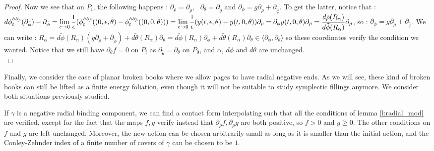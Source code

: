 \documentclass[../main.tex]{subfiles}
\begin{document}
\begin{proof}
Now we see that on $P_i$, the following happens : $\partial_\rho = \partial_{\tilde{\rho}},\text{ } \partial_\theta = \partial_{\tilde{\theta}}$ and $\partial_\phi = g\partial_{\tilde{\rho}} +  \partial_{\tilde{\phi}} $. To get the latter, notice that : $d\phi^{h\partial_\rho}_t(\partial_{\tilde{\phi}}) - \partial_{\tilde{\phi}}= \displaystyle\lim_{\epsilon\rightarrow0}\frac{1}{\epsilon}(\phi_t^{h\partial_{\tilde{\rho}}}((0,\epsilon,\tilde{\theta})-\phi_t^{h\partial_{\tilde{\rho}}}((0,0,\tilde{\theta}))) = \displaystyle\lim_{\epsilon\rightarrow0}\frac{1}{\epsilon}(y(t,\epsilon,\tilde{\theta}) - y(t,0,\tilde{\theta}))\partial_{\tilde{\rho}} = \partial_\phi y(t,0,\tilde{\theta})\partial_{\tilde{\rho}} = \frac{d\tilde{\rho}(R_\alpha)}{d\tilde{\phi}(R_\alpha)}\partial_{\tilde{\rho}}$, so : $\partial_\phi = g\partial_{\tilde{\rho}} + \partial_{\tilde{\phi}}$. We can write : $R_\alpha = d\tilde{\phi}(R_\alpha)(g\partial_{\tilde{\rho}} + \partial_{\tilde{\phi}}) + d\tilde{\theta}(R_\alpha)\partial_\theta = d\tilde{\phi}(R_\alpha)\partial_\phi + d\tilde{\theta}(R_\alpha)\partial_\theta \in \langle\partial_\phi,\partial_\theta\rangle$ so these coordinates verify the condition we wanted. Notice that we still have $\partial_\theta f = 0$ on $P_i$ as $\partial_{\tilde\theta} = \partial_\theta$ on $P_0$, and $\alpha$, $d\phi$ and $d\theta$ are unchanged.\\



\end{proof}

Finally, we consider the case of planar broken books where we allow pages to have radial negative ends. As we will see, these kind of broken books can still be lifted as a finite energy foliation, even though it will not be suitable to study symplectic fillings anymore. We consider both situations previously studied. 

\begin{lemma}\label{l:negative_int}
If $\gamma$ is a negative radial binding component, we can find a contact form interpolating such that all the conditions of lemma \ref{l:radial_mod} are verified, except for the fact that the maps $f,g$ verify instead that $\partial_\rho f, \partial_\rho g$ are both positive, so $f>0$ and $g\geq 0$. The other conditions on $f$ and $g$ are left unchanged. Moreover, the new action can be chosen arbitrarily small as long as it is smaller than the initial action, and the Conley-Zehnder index of a finite number of covers of $\gamma$ can be chosen to be $1$.
\end{lemma}
\end{document}

